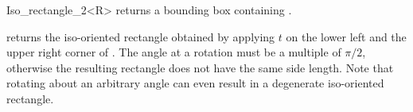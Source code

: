 \begin{ccRefClass} {Iso_rectangle_2<R>}
       {returns a bounding box containing \ccVar. }

       {returns the iso-oriented rectangle obtained by applying $t$ on 
        the lower left and the upper right corner of \ccVar.
        \ccPrecond The angle at a rotation must be a multiple of $\pi/2$,
        otherwise the resulting rectangle does not have the same side length.
        Note that rotating about an arbitrary angle can even result in
        a degenerate  iso-oriented rectangle.}



\ccSeeAlso
{}

\end{ccRefClass} 
